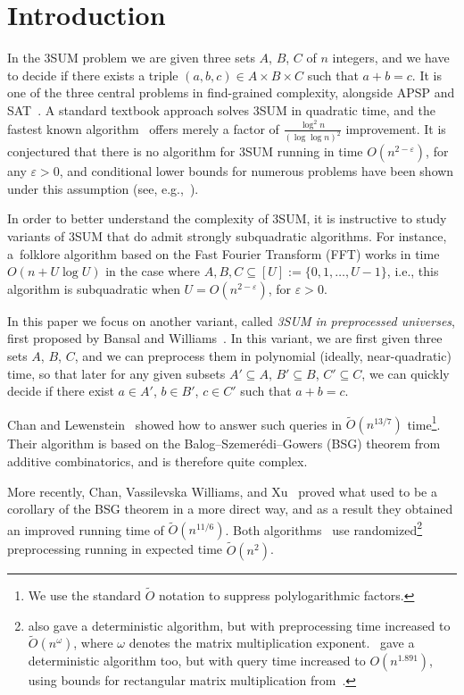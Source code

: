 \documentclass[10pt,a4paper]{article}
\newcommand{\Ot}{\widetilde{O}}
\begin{document}
\section{Introduction}

In the 3SUM problem we are given three sets $A$, $B$, $C$ of $n$ integers, and we have to decide if there exists a triple $(a, b, c) \in A \times B \times C$ such that $a+b = c$. It is one of the three central problems in find-grained complexity, alongside APSP and SAT~\cite{VassilevskaWilliams18}. A standard textbook approach solves 3SUM in quadratic time, and the fastest known algorithm~\cite{BaranDP08} offers merely a factor of $\frac{\log^2 n}{(\log \log n)^2}$ improvement. It is conjectured that there is no algorithm for 3SUM running in time $O(n^{2-\varepsilon})$, for any $\varepsilon > 0$, and conditional lower bounds for numerous problems have been shown under this assumption (see, e.g.,~\cite{VassilevskaWilliams18,FischerK024}).

In order to better understand the complexity of 3SUM, it is instructive to study variants of 3SUM that do admit strongly subquadratic algorithms. For instance, a~folklore algorithm based on the Fast Fourier Transform (FFT) works in time $O(n + U \log U)$ in the case where $A, B, C \subseteq [U] := \{0, 1, \ldots, U-1\}$, i.e., this algorithm is subquadratic when $U = O(n^{2-\varepsilon})$, for $\varepsilon > 0$.

In this paper we focus on another variant, called \emph{3SUM in preprocessed universes}, first proposed by Bansal and Williams~\cite{BansalW12}. In this variant, we are first given three sets $A$, $B$, $C$, and we can preprocess them in polynomial (ideally, near-quadratic) time, so that later for any given subsets $A' \subseteq A$, $B' \subseteq B$, $C' \subseteq C$, we can quickly decide if there exist $a \in A'$, $b \in B'$, $c \in C'$ such that $a+b=c$.

Chan and Lewenstein~\cite{ChanL15} showed how to answer such queries in $\Ot(n^{13/7})$ time\footnote{We use the standard $\Ot$ notation to suppress polylogarithmic factors.}. Their algorithm is based on the Balog--Szemer\'edi--Gowers (BSG) theorem from additive combinatorics, and is therefore quite complex.

More recently, Chan, Vassilevska Williams, and Xu~\cite{ChanWX23} proved what used to be a corollary of the BSG theorem in a more direct way, and as a result they obtained an improved running time of $\Ot(n^{11/6})$. Both algorithms~\cite{ChanL15,ChanWX23} use randomized\footnote{\cite{ChanL15} also gave a deterministic algorithm, but with preprocessing time increased to $\Ot(n^\omega)$, where $\omega$ denotes the matrix multiplication exponent.~\cite{ChanWX23} gave a deterministic algorithm too, but with query time increased to $O(n^{1.891})$, using bounds for rectangular matrix multiplication from~\cite{LeGallU18}.} preprocessing running in expected time $\Ot(n^2)$.
\end{document}

